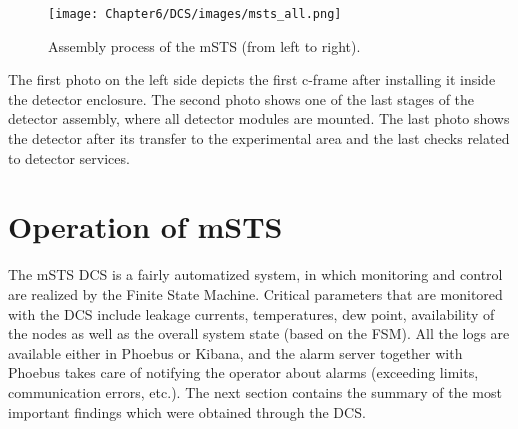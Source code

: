 \begin{figure}[h!]
\centering
\texttt{[image: Chapter6/DCS/images/msts\_all.png]}
\caption{Assembly process of the \gls{mSTS} (from left to right).}
\label{fig_msts_state}
\end{figure}
 The first photo on the left side depicts the first c-frame after installing it inside the detector enclosure. The second photo shows one of the last stages of the detector assembly, where all detector modules are mounted. The last photo shows the detector after its transfer to the experimental area and the last checks related to detector services. %

\section{Operation of mSTS}

The \gls{mSTS} \gls{DCS} is a fairly automatized system, in which monitoring and control are realized by the Finite State Machine. Critical parameters that are monitored with the \gls{DCS} include leakage currents, temperatures, dew point, availability of the nodes as well as the overall system state (based on the \gls{FSM}). All the logs are available either in Phoebus or Kibana, and the alarm server together with Phoebus takes care of notifying the operator about alarms (exceeding limits, communication errors, etc.). The next section contains the summary of the most important findings which were obtained through the \gls{DCS}. 


